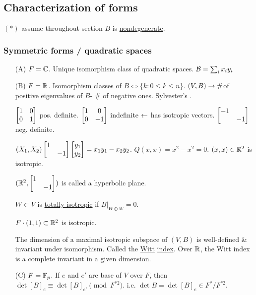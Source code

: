 \documentclass[]{article}
\begin{document}
\subsection*{Characterization of forms}

$(*)$ assume throughout section $B$ is \ul{nondegenerate}.

\subsubsection*{Symmetric forms / quadratic spaces}
\begin{itemize}
	\item[(A)] $F = \mathbb{C}$. Unique isomorphism class of quadratic spaces. $\mathcal{B} = \sum_i x_i y_i$
	\item[(B)] $F = \mathbb{R}$. Isomorphism classes of $B \iff \{k: 0\leq k\leq n\}$. $(V,B) \rightarrow \#$of positive eigenvalues of $B$- \# of negative ones. Sylvester's .
	\begin{example}
		$\begin{bmatrix}1&0\\0&1\end{bmatrix}$ pos. definite. $\begin{bmatrix}1&0\\0&-1\end{bmatrix}$ indefinite $\leftarrow$ has isotropic vectors. $\begin{bmatrix}-1 &\\ &-1\end{bmatrix}$ neg. definite.
	\end{example}
	$(X_1,X_2)\begin{bmatrix}1&\\&-1\end{bmatrix}\begin{bmatrix}y_1\\y_2\end{bmatrix} = x_1y_1 - x_2y_2$. $Q(x,x) = x^2 - x^2 = 0$. $(x,x)\in\mathbb{R}^2$ is isotropic.
	\begin{definition}
		$(\mathbb{R}^2,\begin{bmatrix}1&\\&-1\end{bmatrix})$ is called a hyperbolic plane.
	\end{definition}
	\begin{definition}
		$W\subset V$ is \ul{totally isotropic} if $B|_{W\oplus W} = 0$.
	\end{definition}
	\begin{example}
		$F\cdot(1,1)\subset \mathbb{R}^2$ is isotropic.
	\end{example}
	\begin{theorem}
		[Witt] The dimension of a maximal isotropic subspace of $(V,B)$ is well-defined \& invariant under isomorphism. Called the \ul{Witt} \ul{index}. Over $\mathbb{R}$, the Witt index is a complete invariant in a given dimension.
	\end{theorem}
	\item[(C)] $F = \mathbb{F}_p$. If $e$ and $e'$ are base of $V$ over $F$, then $\det[B]_e \equiv \det[B]_{e'} \pmod{F^{*2}}$. i.e. $\det B = \det[B]_e \in F^*/F^{*2}$.

\end{itemize}
\end{document}
